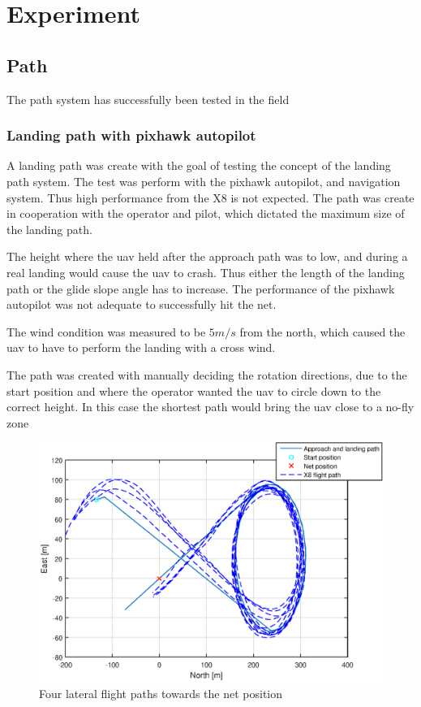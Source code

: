 \chapter{Experiment}
\section{Path}
The path system has successfully been tested in the field 
\subsection{Landing path with pixhawk autopilot}
A landing path was create with the goal of testing the concept of the landing path system. The test was perform with the pixhawk autopilot, and navigation system. Thus high performance from the X8 is not expected. The path was create in cooperation with the operator and pilot, which dictated the maximum size of the landing path.

The height where the \gls{uav} held after the approach path was to low, and during a real landing would cause the \gls{uav} to crash. Thus either the length of the landing path or the glide slope angle has to increase. The performance of the pixhawk autopilot was not adequate to successfully hit the net.

The wind condition was measured to be $5m/s$ from the north, which caused the \gls{uav} to have to perform the landing with a cross wind.

The path was created with manually deciding the rotation directions, due to the start position and where the operator wanted the \gls{uav} to circle down to the correct height. In this case the shortest path would bring the \gls{uav} close to a no-fly zone


\begin{figure}[H]
	\centering
		\includegraphics[width=1\textwidth]{figs/Experiment/NorthEastLandingPathArdu.eps}
		\caption{Four lateral flight paths towards the net position}
		\label{Fig:NorthEastArdu}
\end{figure}
